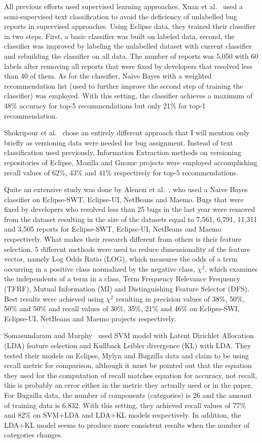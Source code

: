 All previous efforts used supervised learning approaches, Xuan et al.~\cite{Xuan2010} used a semi-supervised text classification to avoid the deficiency of unlabelled bug reports in supervised approaches. Using Eclipse data, they trained their classifier in two steps. First, a basic classifier was built on labeled data, second, the classifier was improved by labeling the unlabelled dataset with current classifier and rebuilding the classifier on all data. The number of reports was 5,050 with 60 labels after removing all reports that were fixed by developers that resolved less than 40 of them. As for the classifier, Naive Bayes with a weighted recommendation list (used to further improve the second step of training the classifier) was employed. With this setting, the classifier achieves a maximum of 48\% accuracy for top-5 recommendations but only 21\% for top-1 recommendation.

Shokripour et al.~\cite{Shokripour2011} chose an entirely different approach that I will mention only briefly as versioning data were needed for bug assignment. Instead of text classification used previously, Information Extraction methods on versioning repositories of Eclipse, Mozilla and Gnome projects were employed accomplishing recall values of 62\%, 43\% and 41\% respectively for top-5 recommendations.

Quite an extensive study was done by Alenezi et al.~\cite{Alenezi2013}, who used a Naive Bayes classifier on Eclipse-SWT, Eclipse-UI, NetBeans and Maemo. Bugs that were fixed by developers who resolved less than 25 bugs in the last year were removed from the dataset resulting in the size of the datasets equal to 7,561, 6,791, 11,311 and 3,505 reports for Eclipse-SWT, Eclipse-UI, NetBeans and Maemo respectively. What makes their research different from others is their feature selection. 5 different methods were used to reduce dimensionality of the feature vector, namely Log Odds Ratio (LOG), which measures the odds of a term occurring in a positive class normalized by the negative class, $\chi^2$, which examines the independents of a term in a class, Term Frequency Relevance Frequency (TFRF), Mutual Information (MI) and Distinguishing Feature Selector (DFS). Best results were achieved using $\chi^2$ resulting in precision values of 38\%, 50\%, 50\% and 50\% and recall values of 30\%, 35\%, 21\% and 46\% on Eclipse-SWI, Eclipse-UI, NetBeans and Maemo projects respectively.

Somasundaram and Murphy~\cite{Somasundaram2012} used SVM model with Latent Dirichlet Allocation (LDA) feature selection and Kullback Leibler divergence (KL) with LDA. They tested their models on Eclipse, Mylyn and Bugzilla data and claim to be using recall metric for comparison, although it must be pointed out that the equation they used for the computation of recall matches equation for accuracy, not recall, this is probably an error either in the metric they actually used or in the paper. For Bugzilla data, the number of components (categories) is 26 and the amount of training data is 6,832. With this setting, they achieved recall values of 77\% and 82\% on SVM+LDA and LDA+KL models respectively. In addition, the LDA+KL model seems to produce more consistent results when the number of categories changes.

